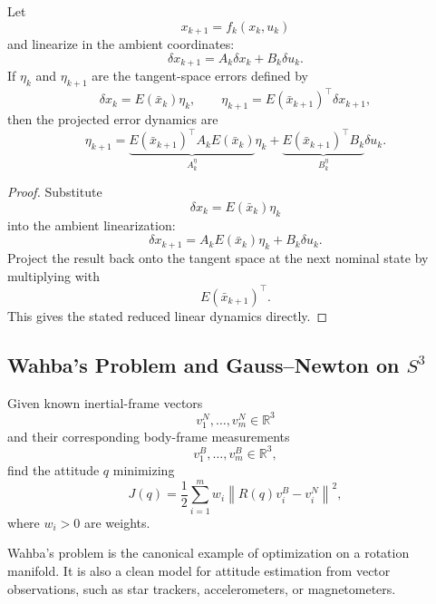\begin{proposition}\label{prop:app-projected-linearization-in-quaternion-error-coordinates}
	Let
	\[
		x_{k+1}=f_k(x_k,u_k)
	\]
	and linearize in the ambient coordinates:
	\[
		\delta x_{k+1}=A_k \delta x_k + B_k \delta u_k.
	\]
	If $\eta_k$ and $\eta_{k+1}$ are the tangent-space errors defined by
	\[
		\delta x_k = E(\bar x_k)\eta_k,
		\qquad
		\eta_{k+1}=E(\bar x_{k+1})^\top \delta x_{k+1},
	\]
	then the projected error dynamics are
	\[
		\eta_{k+1}
		=
		\underbrace{E(\bar x_{k+1})^\top A_k E(\bar x_k)}_{A_k^\eta}\eta_k
		+
		\underbrace{E(\bar x_{k+1})^\top B_k}_{B_k^\eta}\delta u_k.
	\]
\end{proposition}
\begin{proof}
	Substitute
	\[
		\delta x_k=E(\bar x_k)\eta_k
	\]
	into the ambient linearization:
	\[
		\delta x_{k+1}=A_k E(\bar x_k)\eta_k+B_k \delta u_k.
	\]
	Project the result back onto the tangent space at the next nominal state by multiplying with
	\[
		E(\bar x_{k+1})^\top.
	\]
	This gives the stated reduced linear dynamics directly.
\end{proof}

\subsection{Wahba's Problem and Gauss--Newton on $S^3$}
\label{sec:app-wahba-s-problem-and-gauss-newton-on-s3}

\begin{definition}\label{def:app-wahba-s-problem}
	Given known inertial-frame vectors
	\[
		v_1^N,\dots,v_m^N \in \mathbb{R}^{3}
	\]
	and their corresponding body-frame measurements
	\[
		v_1^B,\dots,v_m^B \in \mathbb{R}^{3},
	\]
	find the attitude $q$ minimizing
	\[
		J(q)
		=
		\frac{1}{2}\sum_{i=1}^{m} w_i
		\left\|
			R(q)v_i^B-v_i^N
		\right\|^2,
	\]
	where $w_i>0$ are weights.
\end{definition}

\begin{remark}
	Wahba's problem is the canonical example of optimization on a rotation manifold. It is also a clean model for attitude estimation from vector observations, such as star trackers, accelerometers, or magnetometers.
\end{remark}

